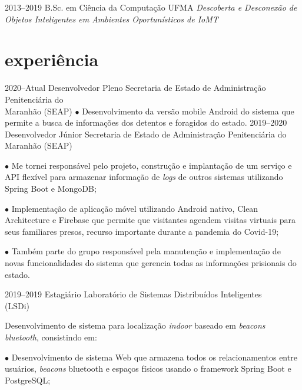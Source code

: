 \documentclass[]{../document-class/twentysecondcv}
\begin{document}
\begin{twenty}
	\twentyitem
		{2013--2019}
		{B.Sc. em Ciência da Computação}
		{UFMA}
		{\emph{Descoberta e Desconexão de Objetos Inteligentes em Ambientes Oportunísticos de IoMT}}
\end{twenty}

\section{experiência}

\begin{twenty}
	\twentyitem
		{2020--Atual} %
		{Desenvolvedor Pleno} %
		{Secretaria de Estado de Administração Penitenciária do \\\hspace*{\fill}Maranhão (SEAP)}
		{$\bullet$ Desenvolvimento da versão mobile Android do sistema que permite a busca de informações dos detentos e foragidos do estado.}
	\twentyitem
		{2019--2020} %
		{Desenvolvedor Júnior} %
		{Secretaria de Estado de Administração Penitenciária do \\\hspace*{\fill}Maranhão (SEAP)}
		{$\bullet$ Me tornei responsável pelo projeto, construção e implantação de um serviço e API flexível para armazenar informação de \textit{logs} de outros sistemas utilizando Spring Boot e MongoDB;\vskip 4pt

		$\bullet$ Implementação de aplicação móvel utilizando Android nativo, Clean Architecture e Firebase que permite que visitantes agendem visitas virtuais para seus familiares presos, recurso importante durante a pandemia do Covid-19;\vskip 4pt

		$\bullet$ Também parte do grupo responsável pela manutenção e implementação de novas funcionalidades do sistema que gerencia todas as informações prisionais do estado.}
	
	\twentyitem
		{2019--2019}
		{Estagiário}
		{Laboratório de Sistemas Distribuídos Inteligentes \\\hspace*{\fill}(LSDi)}
		{Desenvolvimento de sistema para localização \textit{indoor} baseado em \textit{beacons bluetooth}, consistindo em:\vskip 4pt
          
			$\bullet$ Desenvolvimento de sistema Web que armazena todos os relacionamentos entre usuários, \textit{beacons} bluetooth e espaços físicos usando o framework Spring Boot e PostgreSQL;\vskip 4pt
        
}
\end{twenty}
\end{document}

